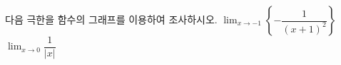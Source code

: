 다음 극한을 함수의 그래프를 이용하여 조사하시오.
 $\displaystyle\lim_{x\to -1}\left\{-\dfrac{1}{(x+1)^2}\right\}$
 $\displaystyle\lim_{x\to 0}\dfrac{1}{|x|}$
